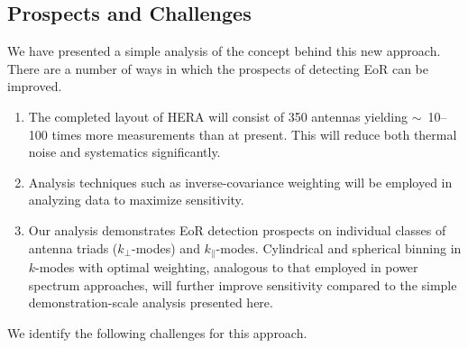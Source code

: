 \documentclass[
reprint,
superscriptaddress,
amsmath,
amssymb,
aps,
]{revtex4-1}
\begin{document}
\subsection{Prospects and Challenges}\label{sec:prospects-challenges}

We have presented a simple analysis of the concept behind this new approach. There are a number of ways in which the prospects of detecting EoR can be improved.

\begin{enumerate}
\item The completed layout of HERA will consist of 350 antennas yielding $\sim$~10--100 times more measurements than at present. This will reduce both thermal noise and systematics significantly. 
\item Analysis techniques such as inverse-covariance weighting \cite{liu14a,liu14b,dil15} will be employed in analyzing data to maximize sensitivity.
\item Our analysis demonstrates EoR detection prospects on individual classes of antenna triads ($k_\perp$-modes) and $k_\parallel$-modes. Cylindrical and spherical binning in $k$-modes with optimal weighting, analogous to that employed in power spectrum approaches, will further improve sensitivity compared to the simple demonstration-scale analysis presented here.
\end{enumerate}

We identify the following challenges for this approach.
\end{document}
